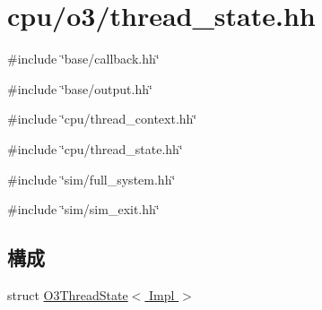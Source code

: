 \hypertarget{o3_2thread__state_8hh}{
\section{cpu/o3/thread\_\-state.hh}
\label{o3_2thread__state_8hh}
}
{\ttfamily \#include \char`\"{}base/callback.hh\char`\"{}}\par
{\ttfamily \#include \char`\"{}base/output.hh\char`\"{}}\par
{\ttfamily \#include \char`\"{}cpu/thread\_\-context.hh\char`\"{}}\par
{\ttfamily \#include \char`\"{}cpu/thread\_\-state.hh\char`\"{}}\par
{\ttfamily \#include \char`\"{}sim/full\_\-system.hh\char`\"{}}\par
{\ttfamily \#include \char`\"{}sim/sim\_\-exit.hh\char`\"{}}\par
\subsection*{構成}
\begin{DoxyCompactItemize}
\item 
struct \hyperlink{structO3ThreadState}{O3ThreadState$<$ Impl $>$}
\end{DoxyCompactItemize}
